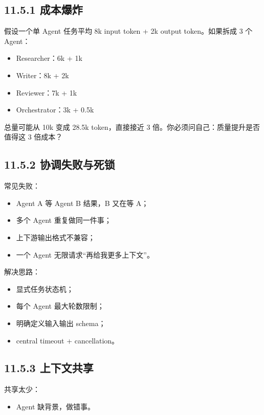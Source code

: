 \subsection{11.5.1 成本爆炸}

假设一个单 Agent 任务平均 8k input token + 2k output token。如果拆成 3 个 Agent：


\begin{itemize}[leftmargin=2em]
\item Researcher：6k + 1k
\item Writer：8k + 2k
\item Reviewer：7k + 1k
\item Orchestrator：3k + 0.5k
\end{itemize}

总量可能从 10k 变成 28.5k token，直接接近 3 倍。你必须问自己：质量提升是否值得这 3 倍成本？


\subsection{11.5.2 协调失败与死锁}

常见失败：


\begin{itemize}[leftmargin=2em]
\item Agent A 等 Agent B 结果，B 又在等 A；
\item 多个 Agent 重复做同一件事；
\item 上下游输出格式不兼容；
\item 一个 Agent 无限请求``再给我更多上下文''。
\end{itemize}

解决思路：


\begin{itemize}[leftmargin=2em]
\item 显式任务状态机；
\item 每个 Agent 最大轮数限制；
\item 明确定义输入输出 schema；
\item central timeout + cancellation。
\end{itemize}

\subsection{11.5.3 上下文共享}

共享太少：


\begin{itemize}[leftmargin=2em]
\item Agent 缺背景，做错事。
\end{itemize}

